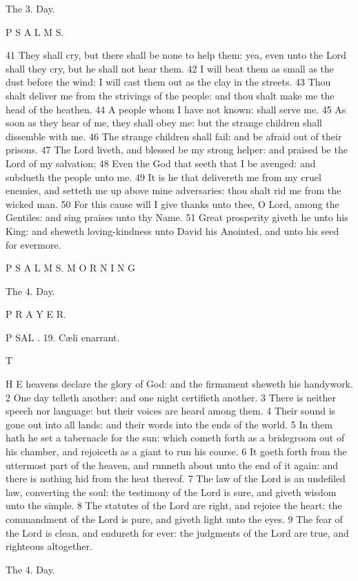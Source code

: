 The 3. Day.

P S A L M S.

41 They shall cry, but there shall be none to help them: yea, even unto the Lord shall they cry, but he shall not hear them. 42 I will beat them as small as the dust before the wind: I will cast them out as the clay in the streets. 43 Thou shalt deliver me from the strivings of the people: and thou shalt make me the head of the heathen. 44 A people whom I have not known: shall serve me. 45 As soon as they hear of me, they shall obey me: but the strange children shall dissemble with me. 46 The strange children shall fail: and be afraid out of their prisons. 47 The Lord liveth, and blessed be my strong helper: and praised be the Lord of my salvation; 48 Even the God that seeth that I be avenged: and subdueth the people unto me. 49 It is he that delivereth me from my cruel enemies, and setteth me up above mine adversaries: thou shalt rid me from the wicked man. 50 For this cause will I give thanks unto thee, O Lord, among the Gentiles: and sing praises unto thy Name. 51 Great prosperity giveth he unto his King: and sheweth loving-kindness unto David his Anointed, and unto his seed for evermore.

P S A L M S. M O R N I N G

The 4. Day.

P R A Y E R.

P SAL . 19. Cæli enarrant.

T

H E heavens declare the glory of God: and the firmament sheweth his handywork. 2 One day telleth another: and one night certifieth another. 3 There is neither speech nor language: but their voices are heard among them. 4 Their sound is gone out into all lands: and their words into the ends of the world. 5 In them hath he set a tabernacle for the sun: which cometh forth as a bridegroom out of his chamber, and rejoiceth as a giant to run his course. 6 It goeth forth from the uttermost part of the heaven, and runneth about unto the end of it again: and there is nothing hid from the heat thereof. 7 The law of the Lord is an undefiled law, converting the soul: the testimony of the Lord is sure, and giveth wisdom unto the simple. 8 The statutes of the Lord are right, and rejoice the heart: the commandment of the Lord is pure, and giveth light unto the eyes. 9 The fear of the Lord is clean, and endureth for ever: the judgments of the Lord are true, and righteous altogether.

The 4. Day.

